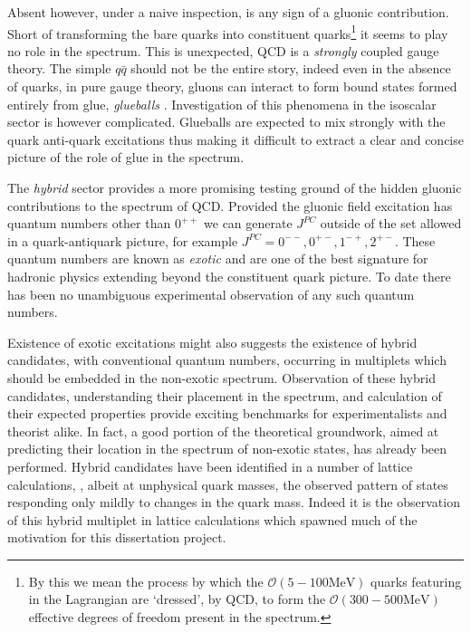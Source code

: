 Absent however, under a naive inspection, is any sign of a gluonic contribution. Short of transforming the bare quarks into constituent quarks\footnote{By this we mean the process by which the $\mathcal{O}(5-100\mathrm{MeV})$ quarks featuring in the Lagrangian are `dressed', by QCD, to form the $\mathcal{O}(300-500\mathrm{MeV})$ effective degrees of freedom present in the spectrum.} it seems to play no role in the spectrum. This is unexpected, QCD is a \emph{strongly} coupled gauge theory. The simple $q\bar{q}$ should not be the entire story, indeed even in the absence of quarks, in pure gauge theory, gluons can interact to form bound states formed entirely from glue, \emph{glueballs} \cite{Morningstar:1999dh}. Investigation of this phenomena in the isoscalar sector is however complicated. Glueballs are expected to mix strongly with the quark anti-quark excitations thus making it difficult to extract a clear and concise picture of the role of glue in the spectrum.

The \emph{hybrid} sector provides a more promising testing ground of the hidden gluonic contributions to the spectrum of QCD. Provided the gluonic field excitation has quantum numbers other than $0^{++}$ we can generate $J^{PC}$ outside of the set allowed in a quark-antiquark picture, for example $J^{PC} = 0^{--}, 0^{+-}, 1^{-+}, 2^{+-}$. These quantum numbers are known as \emph{exotic} and are one of the best signature for hadronic physics extending beyond the constituent quark picture. To date there has been no unambiguous experimental observation of any such quantum numbers.  

Existence of exotic excitations might also suggests the existence of hybrid candidates, with conventional quantum numbers, occurring in multiplets which should be embedded in the non-exotic spectrum. Observation of these hybrid candidates, understanding their placement in the spectrum, and calculation of their expected properties provide exciting benchmarks for experimentalists and theorist alike. In fact, a good portion of the theoretical groundwork, aimed at predicting their location in the spectrum of non-exotic states, has already been performed. Hybrid candidates have been identified in a number of lattice calculations, \cite{Dudek:2007wv,Dudek:2009qf,Dudek:2011bn,Dudek:2012ag,Dudek:2013yja,Liu:2012ze}, albeit at unphysical quark masses, the observed pattern of states responding only mildly to changes in the quark mass.  Indeed it is the observation of this hybrid multiplet in lattice calculations which spawned much of the motivation for this dissertation project. 

